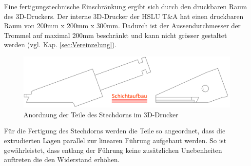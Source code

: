 Eine fertigungstechnische Einschränkung ergibt sich durch den druckbaren Raum des 3D-Druckers. Der interne 3D-Drucker der HSLU T\&A hat einen druckbaren Raum von 200mm x 200mm x 300mm. Dadurch ist der Aussendurchmesser der Trommel auf maximal 200mm beschränkt und kann nicht grösser gestaltet werden (vgl. Kap. \ref{sec:Vereinzelung}).

\begin{figure}[H]
	\includegraphics[scale=0.115]{Illustrationen/6-Umsetzung/anordnung_fdm.jpg}
	\caption{Anordnung der Teile des Stechdorns im 3D-Drucker}
	\label{fig:anordnung_fdm}
\end{figure}
Für die Fertigung des Stechdorns werden die Teile so angeordnet, dass die extrudierten Lagen parallel zur linearen Führung aufgebaut werden. So ist gewährleistet, dass entlang der Führung keine zusätzlichen Unebenheiten auftreten die den Widerstand erhöhen.
